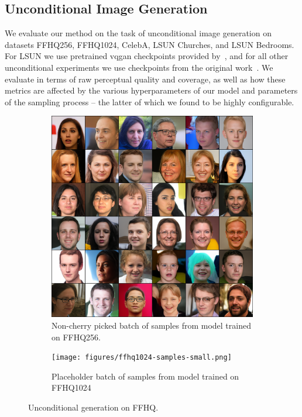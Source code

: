 \subsection{Unconditional Image Generation}

We evaluate our method on the task of unconditional image generation on datasets
FFHQ256, FFHQ1024, CelebA, LSUN Churches, and LSUN Bedrooms. For LSUN we use
pretrained \gls{vqgan} checkpoints provided by~\cite{bondtaylor2021unleashing},
and for all other unconditional experiments we use checkpoints from the original
work~\cite{esser2021taming}. We evaluate in terms of raw perceptual quality and
coverage, as well as how these metrics are affected by the various
hyperparameters of our model and parameters of the sampling process -- the
latter of which we found to be highly configurable.

\begin{figure}[ht]
    \centering
    \begin{subfigure}[b]{0.47\textwidth}
        \centering
        \includegraphics[width=1.0\textwidth]{figures/ffhq256-samples.png}
        \caption{
            Non-cherry picked batch of samples from model trained on FFHQ256.
        }
    \end{subfigure}
    \hfill
    \begin{subfigure}[b]{0.47\textwidth}
        \centering
        \texttt{[image: figures/ffhq1024-samples-small.png]}
        \caption{
            Placeholder batch of samples from model trained on FFHQ1024
        }
    \end{subfigure}
    \caption{Unconditional generation on FFHQ.}
\end{figure}

